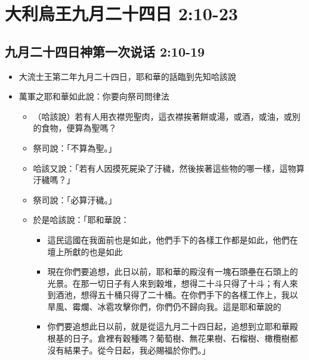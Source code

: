 \section{大利烏王九月二十四日 2:10-23}
\subsection{九月二十四日神第一次说话 2:10-19}
\begin{itemize} 
\itemsep-.35em 
\item 大流士王第二年九月二十四日，耶和華的話臨到先知哈該說
\item 萬軍之耶和華如此說：你要向祭司問律法
\begin{itemize} 
\itemsep-.35em 
\item （哈該說）若有人用衣襟兜聖肉，這衣襟挨著餅或湯，或酒，或油，或別的食物，便算為聖嗎？ 
\item 祭司說：「不算為聖。」 
\item 哈該又說：「若有人因摸死屍染了汙穢，然後挨著這些物的哪一樣，這物算汙穢嗎？」
\item 祭司說：「必算汙穢。」
\item 於是哈該說：「耶和華說：
\begin{itemize} 
\itemsep-.35em 
\item 這民這國在我面前也是如此，他們手下的各樣工作都是如此，他們在壇上所獻的也是如此 
\item 現在你們要追想，此日以前，耶和華的殿沒有一塊石頭壘在石頭上的光景。在那一切日子有人來到穀堆，想得二十斗只得了十斗；有人來到酒池，想得五十桶只得了二十桶。在你們手下的各樣工作上，我以旱風、霉爛、冰雹攻擊你們，你們仍不歸向我。這是耶和華說的 
\item 你們要追想此日以前，就是從這九月二十四日起，追想到立耶和華殿根基的日子。倉裡有穀種嗎？葡萄樹、無花果樹、石榴樹、橄欖樹都沒有結果子。從今日起，我必賜福於你們。」
\end{itemize}
\end{itemize}
\end{itemize}


